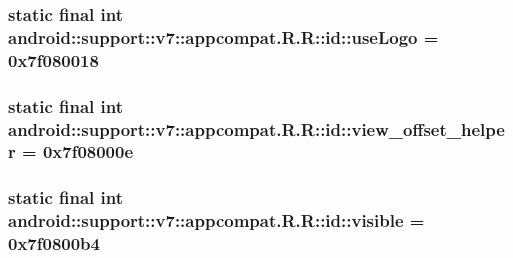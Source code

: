 \hypertarget{classandroid_1_1support_1_1v7_1_1appcompat_1_1_r_1_1id_0559cd4625d835ed7dd6a317e1e43456}{
\subsubsection[{useLogo}]{\setlength{\rightskip}{0pt plus 5cm}static final int android::support::v7::appcompat.R.R::id::useLogo = 0x7f080018}}
\label{classandroid_1_1support_1_1v7_1_1appcompat_1_1_r_1_1id_0559cd4625d835ed7dd6a317e1e43456}


\hypertarget{classandroid_1_1support_1_1v7_1_1appcompat_1_1_r_1_1id_0af6897aef6f1c55d08f7efd4bf9ce22}{
\subsubsection[{view\_\-offset\_\-helper}]{\setlength{\rightskip}{0pt plus 5cm}static final int android::support::v7::appcompat.R.R::id::view\_\-offset\_\-helper = 0x7f08000e}}
\label{classandroid_1_1support_1_1v7_1_1appcompat_1_1_r_1_1id_0af6897aef6f1c55d08f7efd4bf9ce22}


\hypertarget{classandroid_1_1support_1_1v7_1_1appcompat_1_1_r_1_1id_8a6adf76f51fcfce9ecf0664d28238a1}{
\subsubsection[{visible}]{\setlength{\rightskip}{0pt plus 5cm}static final int android::support::v7::appcompat.R.R::id::visible = 0x7f0800b4}}
\label{classandroid_1_1support_1_1v7_1_1appcompat_1_1_r_1_1id_8a6adf76f51fcfce9ecf0664d28238a1}


